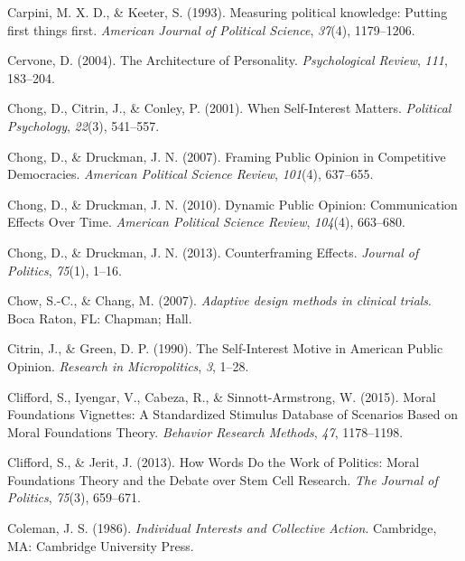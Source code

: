 \documentclass[12pt,econ]{sources/authesis}
\begin{document}
\leavevmode\hypertarget{ref-carpini_1993_measuring}{}%
Carpini, M. X. D., \& Keeter, S. (1993). Measuring political knowledge: Putting first things first. \emph{American Journal of Political Science}, \emph{37}(4), 1179--1206.

\leavevmode\hypertarget{ref-cervone_2004_architecture}{}%
Cervone, D. (2004). The Architecture of Personality. \emph{Psychological Review}, \emph{111}, 183--204.

\leavevmode\hypertarget{ref-chong_when_2001}{}%
Chong, D., Citrin, J., \& Conley, P. (2001). When Self-Interest Matters. \emph{Political Psychology}, \emph{22}(3), 541--557.

\leavevmode\hypertarget{ref-chong_framing_2007}{}%
Chong, D., \& Druckman, J. N. (2007). Framing Public Opinion in Competitive Democracies. \emph{American Political Science Review}, \emph{101}(4), 637--655.

\leavevmode\hypertarget{ref-chong_dynamic_2010}{}%
Chong, D., \& Druckman, J. N. (2010). Dynamic Public Opinion: Communication Effects Over Time. \emph{American Political Science Review}, \emph{104}(4), 663--680.

\leavevmode\hypertarget{ref-chong_counterframing_2013}{}%
Chong, D., \& Druckman, J. N. (2013). Counterframing Effects. \emph{Journal of Politics}, \emph{75}(1), 1--16.

\leavevmode\hypertarget{ref-chow_2007_adaptive}{}%
Chow, S.-C., \& Chang, M. (2007). \emph{Adaptive design methods in clinical trials}. Boca Raton, FL: Chapman; Hall.

\leavevmode\hypertarget{ref-citrin_1990_self-interest}{}%
Citrin, J., \& Green, D. P. (1990). The Self-Interest Motive in American Public Opinion. \emph{Research in Micropolitics}, \emph{3}, 1--28.

\leavevmode\hypertarget{ref-clifford_2015_moral}{}%
Clifford, S., Iyengar, V., Cabeza, R., \& Sinnott-Armstrong, W. (2015). Moral Foundations Vignettes: A Standardized Stimulus Database of Scenarios Based on Moral Foundations Theory. \emph{Behavior Research Methods}, \emph{47}, 1178--1198.

\leavevmode\hypertarget{ref-clifford_2013_words}{}%
Clifford, S., \& Jerit, J. (2013). How Words Do the Work of Politics: Moral Foundations Theory and the Debate over Stem Cell Research. \emph{The Journal of Politics}, \emph{75}(3), 659--671.

\leavevmode\hypertarget{ref-coleman_1986_individual}{}%
Coleman, J. S. (1986). \emph{Individual Interests and Collective Action}. Cambridge, MA: Cambridge University Press.
\end{document}
